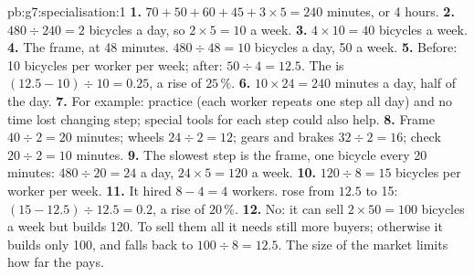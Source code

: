 \begin{solution}{pb:g7:specialisation:1}
\textbf{1.} $70 + 50 + 60 + 45 + 3 \times 5 = 240$ minutes, or 4 hours.
\textbf{2.} $480 \div 240 = 2$ bicycles a day, so $2 \times 5 = 10$ a week.
\textbf{3.} $4 \times 10 = 40$ bicycles a week.
\textbf{4.} The frame, at 48 minutes. $480 \div 48 = 10$ bicycles a day, 50 a week.
\textbf{5.} Before: 10 bicycles per worker per week; after: $50 \div 4 = 12.5$. The  is $(12.5 - 10) \div 10 = 0.25$, a rise of $25\,\%$.
\textbf{6.} $10 \times 24 = 240$ minutes a day, half of the day.
\textbf{7.} For example: practice (each worker repeats one step all day) and no time
lost changing step; special tools for each step could also help.
\textbf{8.} Frame $40 \div 2 = 20$ minutes; wheels $24 \div 2 = 12$; gears and brakes $32
\div 2 = 16$; check $20 \div 2 = 10$ minutes.
\textbf{9.} The slowest step is the frame, one bicycle every 20 minutes: $480 \div 20 =
24$ a day, $24 \times 5 = 120$ a week.
\textbf{10.} $120 \div 8 = 15$ bicycles per worker per week.
\textbf{11.} It hired $8 - 4 = 4$ workers.  rose from $12.5$ to 15:
$(15 - 12.5) \div 12.5 = 0.2$, a rise of $20\,\%$.
\textbf{12.} No: it can sell $2 \times 50 = 100$ bicycles a week but builds 120. To sell
them all it needs still more buyers; otherwise it builds only 100, and 
falls back to $100 \div 8 = 12.5$. The size of the market limits how far the  pays.
\end{solution}
